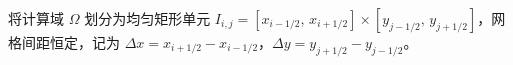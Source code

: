 \documentclass[12pt,a4paper]{article}
\numberwithin{equation}{section}    %
\begin{document}

将计算域 $\Omega$ 划分为均匀矩形单元 $I_{i,j} = [x_{i-1/2},\, x_{i+1/2}]
\times [y_{j-1/2},\, y_{j+1/2}]$，网格间距恒定，记为
$\Delta x = x_{i+1/2} - x_{i-1/2}$，$\Delta y = y_{j+1/2} - y_{j-1/2}$。
\end{document}
